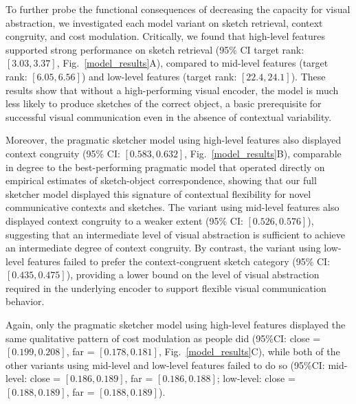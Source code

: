 \documentclass{svjour3}
\begin{document}
To further probe the functional consequences of decreasing the capacity for visual abstraction, we investigated each model variant on sketch retrieval, context congruity, and cost modulation. 
Critically, we found that high-level features supported strong performance on sketch retrieval (95\% CI target rank: $[3.03, 3.37]$, Fig.~\ref{model_results}A), compared to mid-level features (target rank: $[6.05, 6.56]$) and low-level features (target rank: $[22.4, 24.1]$). 
These results show that without a high-performing visual encoder, the model is much less likely to produce sketches of the correct object, a basic prerequisite for successful visual communication even in the absence of contextual variability. 

Moreover, the pragmatic sketcher model using high-level features also displayed context congruity (95\% CI: $[0.583, 0.632]$, Fig.~\ref{model_results}B), comparable in degree to the best-performing pragmatic model that operated directly on empirical estimates of sketch-object correspondence, showing that our full sketcher model displayed this signature of contextual flexibility for novel communicative contexts and sketches. 
The variant using mid-level features also displayed context congruity to a weaker extent (95\% CI: $[0.526, 0.576]$), suggesting that an intermediate level of visual abstraction is sufficient to achieve an intermediate degree of context congruity. 
By contrast, the variant using low-level features failed to prefer the context-congruent sketch category (95\% CI: $[0.435, 0.475]$), providing a lower bound on the level of visual abstraction required in the underlying encoder to support flexible visual communication behavior. 

Again, only the pragmatic sketcher model using high-level features displayed the same qualitative pattern of cost modulation as people did (95\%CI: close = $[0.199, 0.208]$, far = $[0.178, 0.181]$, Fig.~\ref{model_results}C), while both of the other variants using mid-level and low-level features failed to do so (95\%CI: mid-level: close = $[0.186, 0.189]$, far = $[0.186, 0.188]$; low-level: close = $[0.188, 0.189]$, far = $[0.188, 0.189]$).  
\end{document}
